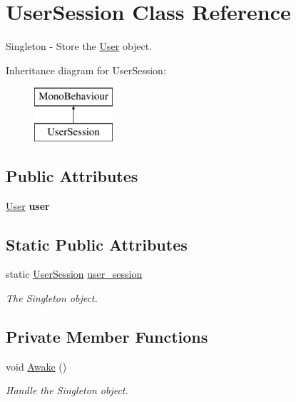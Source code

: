 \hypertarget{class_user_session}{}\section{User\+Session Class Reference}
\label{class_user_session}


Singleton -\/ Store the \mbox{\hyperlink{class_user}{User}} object.  


Inheritance diagram for User\+Session\+:\begin{figure}[H]
\begin{center}
\leavevmode
\includegraphics[height=2.000000cm]{class_user_session}
\end{center}
\end{figure}
\subsection*{Public Attributes}
\begin{DoxyCompactItemize}
\item 
\mbox{\label{class_user_session_ac49138881aafd0ea64d7e73b1beb7eb5}} 
\mbox{\hyperlink{class_user}{User}} {\bfseries user}
\end{DoxyCompactItemize}
\subsection*{Static Public Attributes}
\begin{DoxyCompactItemize}
\item 
\mbox{\label{class_user_session_aa2651c5c9a3108e8a545c100a16387a1}} 
static \mbox{\hyperlink{class_user_session}{User\+Session}} \mbox{\hyperlink{class_user_session_aa2651c5c9a3108e8a545c100a16387a1}{user\+\_\+session}}
\begin{DoxyCompactList}\small\item\em The Singleton object. \end{DoxyCompactList}\end{DoxyCompactItemize}
\subsection*{Private Member Functions}
\begin{DoxyCompactItemize}
\item 
\mbox{\label{class_user_session_af727750c85b37856babe7fa27886aaab}} 
void \mbox{\hyperlink{class_user_session_af727750c85b37856babe7fa27886aaab}{Awake}} ()
\begin{DoxyCompactList}\small\item\em Handle the Singleton object. \end{DoxyCompactList}\end{DoxyCompactItemize}


